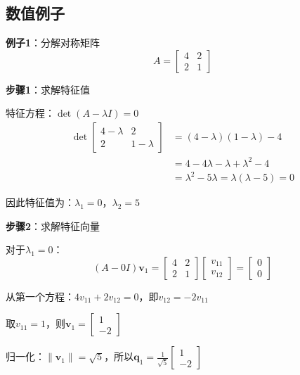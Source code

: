 \documentclass[12pt,a4paper]{article}
\begin{document}
\subsection{数值例子}

\textbf{例子1}：分解对称矩阵
\begin{equation}
A = \begin{bmatrix} 4 & 2 \\ 2 & 1 \end{bmatrix}
\end{equation}

\textbf{步骤1}：求解特征值

特征方程：$\det(A - \lambda I) = 0$
\begin{align}
\det\begin{bmatrix} 4-\lambda & 2 \\ 2 & 1-\lambda \end{bmatrix} &= (4-\lambda)(1-\lambda) - 4 \\
&= 4 - 4\lambda - \lambda + \lambda^2 - 4 \\
&= \lambda^2 - 5\lambda = \lambda(\lambda - 5) = 0
\end{align}

因此特征值为：$\lambda_1 = 0$，$\lambda_2 = 5$

\textbf{步骤2}：求解特征向量

对于$\lambda_1 = 0$：
\begin{equation}
(A - 0I)\bm{v}_1 = \begin{bmatrix} 4 & 2 \\ 2 & 1 \end{bmatrix} \begin{bmatrix} v_{11} \\ v_{12} \end{bmatrix} = \begin{bmatrix} 0 \\ 0 \end{bmatrix}
\end{equation}

从第一个方程：$4v_{11} + 2v_{12} = 0$，即$v_{12} = -2v_{11}$

取$v_{11} = 1$，则$\bm{v}_1 = \begin{bmatrix} 1 \\ -2 \end{bmatrix}$

归一化：$\|\bm{v}_1\| = \sqrt{5}$，所以$\bm{q}_1 = \frac{1}{\sqrt{5}} \begin{bmatrix} 1 \\ -2 \end{bmatrix}$
\end{document}
